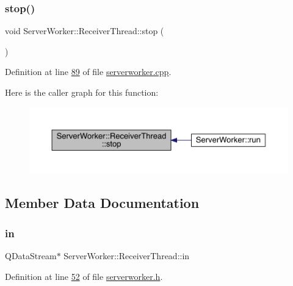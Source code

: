\subsubsection{\texorpdfstring{stop()}{stop()}}
{\footnotesize\ttfamily void Server\+Worker\+::\+Receiver\+Thread\+::stop (\begin{DoxyParamCaption}{ }\end{DoxyParamCaption})}



Definition at line \hyperlink{a00107_source_l00089}{89} of file \hyperlink{a00107_source}{serverworker.\+cpp}.

Here is the caller graph for this function\+:
\nopagebreak
\begin{figure}[H]
\begin{center}
\leavevmode
\includegraphics[width=350pt]{dd/df4/a00193_ab4b5a368d07b2670c72be1a04404f76d_icgraph}
\end{center}
\end{figure}


\subsection{Member Data Documentation}
\mbox{\label{a00193_a15a77c31da23a15968944100e884b88e}} 
\subsubsection{\texorpdfstring{in}{in}}
{\footnotesize\ttfamily Q\+Data\+Stream$\ast$ Server\+Worker\+::\+Receiver\+Thread\+::in\hspace{0.3cm}{\ttfamily [protected]}}



Definition at line \hyperlink{a00110_source_l00052}{52} of file \hyperlink{a00110_source}{serverworker.\+h}.

\mbox{\label{a00193_a2b37a2d966c912535eb3463bc0d60a22}} 
